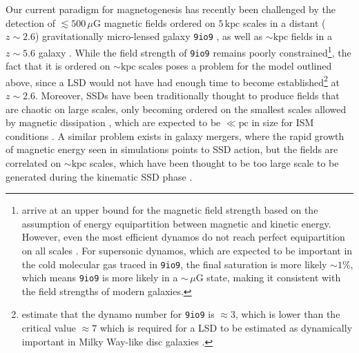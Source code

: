 Our current paradigm for magnetogenesis has recently been challenged by the detection of \mbox{$\lesssim 500 \,\mu\mathrm{G}$} magnetic fields ordered on $5 \,\mathrm{kpc}$ scales in a distant ($z \sim 2.6$) gravitationally micro-lensed galaxy \texttt{9io9} \citep{geach2023polarized}, as well as $\sim \mathrm{kpc}$ fields in a $z \sim 5.6$ galaxy \citep{chen2024kiloparsec}. While the field strength of \texttt{9io9} remains poorly constrained\footnote{
    \citet{geach2023polarized} arrive at an upper bound for the magnetic field strength based on the assumption of energy equipartition between magnetic and kinetic energy. However, even the most efficient dynamos do not reach perfect equipartition on all scales \citep[\eg][]{federrath2011mach, federrath2014turbulent, kriel2022fundamental, beattie2022growth}. For supersonic dynamos, which are expected to be important in the cold molecular gas traced in \texttt{9io9}, the final saturation is more likely $\sim 1\%$, which means \texttt{9io9} is more likely in a $\sim \,\mu\mathrm{G}$ state, making it consistent with the field strengths of modern galaxies.
}, the fact that it is ordered on $\sim \mathrm{kpc}$ scales poses a problem for the model outlined above, since a LSD would not have had enough time to become established\footnote{
    \citet{geach2023polarized} estimate that the dynamo number for \texttt{9io9} is $\approx 3$, which is lower than the critical value $\approx 7$ which is required for a LSD to be estimated as dynamically important in Milky Way-like disc galaxies \citep{ruzmaikin1988magnetism}.
} at $z \sim 2.6$. Moreover, SSDs have been traditionally thought to produce fields that are chaotic on large scales, only becoming ordered on the smallest scales allowed by magnetic dissipation \citep[\eg][]{schekochihin2004simulations, kriel2022fundamental, brandenburg2023dissipative}, which are expected to be $\ll \mathrm{pc}$ in size for ISM conditions \citep{marchand2016chemical}. A similar problem exists in galaxy mergers, where the rapid growth of magnetic energy seen in simulations points to SSD action, but the fields are correlated on $\sim \mathrm{kpc}$ scales, which have been thought to be too large scale to be generated during the kinematic SSD phase \citep[\eg][]{rodenbeck2016magnetic, basu2017detection, brzycki2019parameter, whittingham2021impact}.

